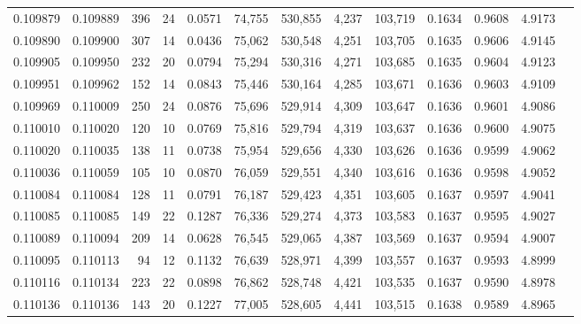 \begin{tabular}{rrrrrrrrrrrrr}
0.109879 & 0.109889 &   396 &  24 &                                     0.0571 &  74,755 & 530,855 &   4,237 & 103,719 & 0.1634 & 0.9608 & 4.9173 \\
0.109890 & 0.109900 &   307 &  14 &                                     0.0436 &  75,062 & 530,548 &   4,251 & 103,705 & 0.1635 & 0.9606 & 4.9145 \\
0.109905 & 0.109950 &   232 &  20 &                                     0.0794 &  75,294 & 530,316 &   4,271 & 103,685 & 0.1635 & 0.9604 & 4.9123 \\
0.109951 & 0.109962 &   152 &  14 &                                     0.0843 &  75,446 & 530,164 &   4,285 & 103,671 & 0.1636 & 0.9603 & 4.9109 \\
0.109969 & 0.110009 &   250 &  24 &                                     0.0876 &  75,696 & 529,914 &   4,309 & 103,647 & 0.1636 & 0.9601 & 4.9086 \\
0.110010 & 0.110020 &   120 &  10 &                                     0.0769 &  75,816 & 529,794 &   4,319 & 103,637 & 0.1636 & 0.9600 & 4.9075 \\
0.110020 & 0.110035 &   138 &  11 &                                     0.0738 &  75,954 & 529,656 &   4,330 & 103,626 & 0.1636 & 0.9599 & 4.9062 \\
0.110036 & 0.110059 &   105 &  10 &                                     0.0870 &  76,059 & 529,551 &   4,340 & 103,616 & 0.1636 & 0.9598 & 4.9052 \\
0.110084 & 0.110084 &   128 &  11 &                                     0.0791 &  76,187 & 529,423 &   4,351 & 103,605 & 0.1637 & 0.9597 & 4.9041 \\
0.110085 & 0.110085 &   149 &  22 &                                     0.1287 &  76,336 & 529,274 &   4,373 & 103,583 & 0.1637 & 0.9595 & 4.9027 \\
0.110089 & 0.110094 &   209 &  14 &                                     0.0628 &  76,545 & 529,065 &   4,387 & 103,569 & 0.1637 & 0.9594 & 4.9007 \\
0.110095 & 0.110113 &    94 &  12 &                                     0.1132 &  76,639 & 528,971 &   4,399 & 103,557 & 0.1637 & 0.9593 & 4.8999 \\
0.110116 & 0.110134 &   223 &  22 &                                     0.0898 &  76,862 & 528,748 &   4,421 & 103,535 & 0.1637 & 0.9590 & 4.8978 \\
0.110136 & 0.110136 &   143 &  20 &                                     0.1227 &  77,005 & 528,605 &   4,441 & 103,515 & 0.1638 & 0.9589 & 4.8965 \\

\end{tabular}
